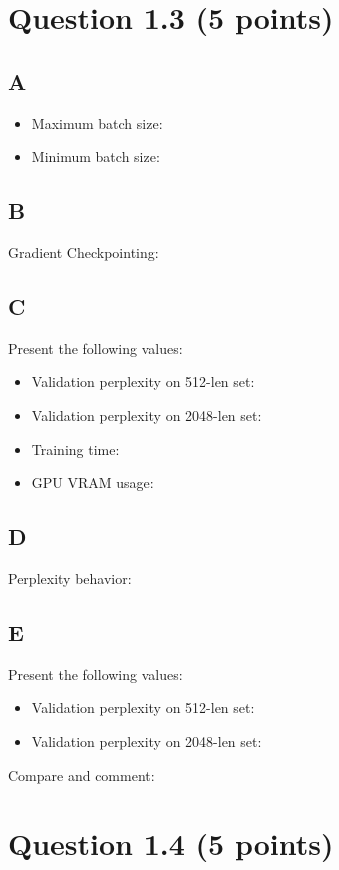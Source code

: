 \documentclass{article}
\begin{document}
\section*{Question 1.3 (5 points)}

\subsection*{A}
\begin{itemize}
    \item Maximum batch size:
    \item Minimum batch size:
\end{itemize}


\subsection*{B}
Gradient Checkpointing:

\subsection*{C}
Present the following values:
\begin{itemize}
    \item Validation perplexity on 512-len set:
    \item Validation perplexity on 2048-len set:
    \item Training time:
    \item GPU VRAM usage:
\end{itemize}

\subsection*{D}
Perplexity behavior:

\subsection*{E}
Present the following values:
\begin{itemize}
    \item Validation perplexity on 512-len set:
    \item Validation perplexity on 2048-len set:
\end{itemize}

\noindent Compare and comment: 

\section*{Question 1.4 (5 points)}
\end{document}
